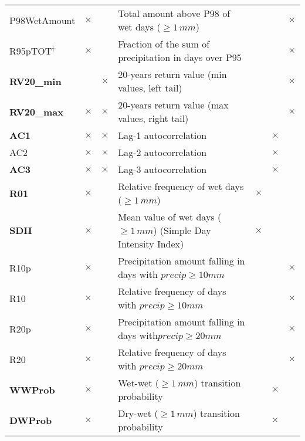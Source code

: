 \documentclass[11pt]{amsart}
\begin{document}
\begin{table}[!htb]
{\begin{tabular}{lllllll}
P98WetAmount                & $\times$  &           & Total amount above P98 of wet days ($\ge 1\, mm$)    & & & $\times$   \\
R95pTOT$^\dag$  		 & $\times$  &           & Fraction of the sum of precipitation in days over P95 &  &  &  $\times$  \\  
\textbf{RV20\_min}           &           & $\times$  & 20-years return value (min values, left tail)                    & & & $\times$   \\
\textbf{RV20\_max}           & $\times$  & $\times$  & 20-years return value (max values, right tail)          & & & $\times$   \\
\textbf{AC1}                & $\times$  & $\times$  & Lag-1 autocorrelation                                                     & &  $\times$  & \\
AC2                         & $\times$  & $\times$  & Lag-2 autocorrelation                                                     & &  $\times$  & \\
\textbf{AC3}                & $\times$  & $\times$  & Lag-3 autocorrelation                                                     & & $\times$ &   \\  
\textbf{R01}                & $\times$  &           & Relative frequency of wet days ($\ge 1\, mm$)                      & $\times$ & &   \\
\textbf{SDII}               & $\times$  &           & Mean value of wet days ($\ge 1\, mm$)  (Simple Day Intensity Index)          & $\times$ & &   \\
R10p                        & $\times$  &           & Precipitation amount falling in days with $precip \ge 10mm$                  & & & $\times$           \\
R10                         & $\times$  &           & Relative frequency of days with $precip \ge 10mm$                            & & & $\times$   \\
R20p                        & $\times$  &           & Precipitation amount falling in days with$precip \ge 20mm$                  & & & $\times$           \\
R20                         & $\times$  &           & Relative frequency of days with $precip \ge 20mm$                            & & &  $\times$          \\
\textbf{WWProb}             & $\times$  &           & Wet-wet ($\ge 1\, mm$) transition probability                                 & &  $\times$  & \\
\textbf{DWProb}             & $\times$  &           & Dry-wet ($\ge 1\, mm$)  transition probability                              & &  $\times$  & \\

\end{tabular}}
\end{table}
\end{document}
